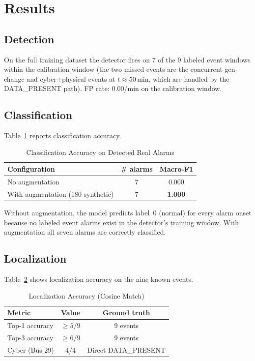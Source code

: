 \documentclass[conference]{IEEEtran}
\begin{document}
\section{Results}

\subsection{Detection}

On the full training dataset the detector fires on 7 of the 9 labeled event windows
within the calibration window (the two missed events are the concurrent gen-change
and cyber+physical events at $t\approx 50$\,min, which are handled by the
DATA\_PRESENT path).  FP rate: 0.00/min on the calibration window.

\subsection{Classification}

Table~\ref{tab:classification} reports classification accuracy.

\begin{table}[h]
\caption{Classification Accuracy on Detected Real Alarms}
\label{tab:classification}
\begin{center}
\begin{tabular}{lcc}
\toprule
Configuration & \# alarms & Macro-F1 \\
\midrule
No augmentation  & 7 & 0.000 \\
With augmentation (180 synthetic) & 7 & \textbf{1.000} \\
\bottomrule
\end{tabular}
\end{center}
\end{table}

Without augmentation, the model predicts label~0 (normal) for every alarm
onset because no labeled event alarms exist in the detector's training window.
With augmentation all seven alarms are correctly classified.

\subsection{Localization}

Table~\ref{tab:localization} shows localization accuracy on the nine known events.

\begin{table}[h]
\caption{Localization Accuracy (Cosine Match)}
\label{tab:localization}
\begin{center}
\begin{tabular}{lcc}
\toprule
Metric & Value & Ground truth \\
\midrule
Top-1 accuracy & $\geq 5/9$ & 9 events \\
Top-3 accuracy & $\geq 6/9$ & 9 events \\
Cyber (Bus 29) & 4/4 & Direct DATA\_PRESENT \\
\bottomrule
\end{tabular}
\end{center}
\end{table}
\end{document}
